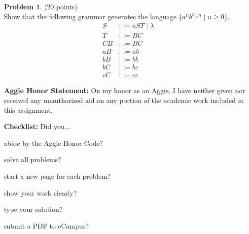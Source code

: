 \documentclass{article}
\theoremstyle{definition}
\newtheorem{problem}{Problem}
\newtheorem*{solution}{Solution}
\newcommand{\honor}{\noindent \textbf{Aggie Honor Statement: }On my honor as an Aggie, I have neither
  given nor received any unauthorized aid on any portion of the academic work included in this assignment.
}
\newcommand{\checklist}{\noindent\textbf{Checklist:}
Did you...
\begin{compactenum}
\item abide by the Aggie Honor Code?
\item solve all problems?
\item start a new page for each problem?
\item show your work clearly?
\item type your solution?
\item submit a PDF to eCampus?
\end{compactenum}
}
\begin{document}


\begin{problem} (20 points)\\
Show that the following grammar generates the language $\{a^nb^nc^n \mid n\geq 0\}$.
\begin{align*}
S &::= aST \mid \lambda\\
T &::= BC\\
CB &::= BC\\
aB &::= ab\\
bB &::= bb\\
bC &::= bc\\
cC &::= cc
\end{align*}
\end{problem}



\bigskip
\honor

\bigskip
\checklist
\end{document}
